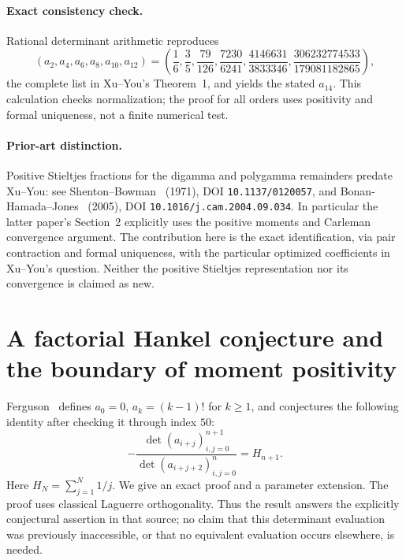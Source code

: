 \documentclass[11pt,a4paper]{article}
\theoremstyle{definition}
\theoremstyle{remark}
\numberwithin{equation}{section}
\begin{document}
\paragraph{Exact consistency check.}
Rational determinant arithmetic reproduces
\[
 (a_2,a_4,a_6,a_8,a_{10},a_{12})=
 \left(\frac16,\frac35,\frac{79}{126},\frac{7230}{6241},
 \frac{4146631}{3833346},\frac{306232774533}{179081182865}\right),
\]
the complete list in Xu--You's Theorem~1, and yields the stated $a_{14}$.
This calculation checks normalization; the proof for all orders uses
positivity and formal uniqueness, not a finite numerical test.


\paragraph{Prior-art distinction.}
Positive Stieltjes fractions for the digamma and polygamma remainders
predate Xu--You: see Shenton--Bowman~\cite{p3:ShentonBowman1971} (1971), DOI
\texttt{10.1137/0120057}, and Bonan-Hamada--Jones~\cite{p3:BonanJones2005} (2005), DOI
\texttt{10.1016/j.cam.2004.09.034}. In particular the latter paper's
Section~2 explicitly uses the positive moments and Carleman convergence
argument. The contribution here is the exact identification, via pair
contraction and formal uniqueness, with the particular optimized
coefficients in Xu--You's question. Neither the positive Stieltjes
representation nor its convergence is claimed as new.



\section{A factorial Hankel conjecture and the boundary of moment positivity}
\label{p3:sec:factorial-hankel}

Ferguson~\cite[p.~6, final example of Section~2]{p3:Ferguson2020} defines
$a_0=0$, $a_k=(k-1)!$ for $k\ge1$, and conjectures the following identity
after checking it through index $50$:
\[
 -\frac{\det(a_{i+j})_{i,j=0}^{n+1}}
 {\det(a_{i+j+2})_{i,j=0}^{n}}=H_{n+1}.
\]
Here $H_N=\sum_{j=1}^N1/j$. We give an exact proof and a parameter extension.
The proof uses classical Laguerre orthogonality. Thus the result answers
the explicitly conjectural assertion in that source; no claim that this
determinant evaluation was previously inaccessible, or that no equivalent
evaluation occurs elsewhere, is needed.
\end{document}
